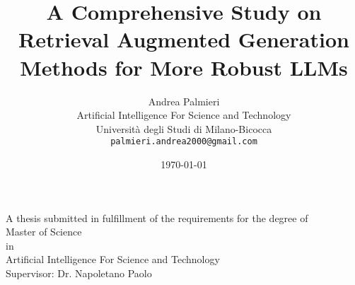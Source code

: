 \documentclass[12pt, a4paper]{report} %
\title{A Comprehensive Study on Retrieval Augmented Generation Methods for More Robust LLMs}
\author{Andrea Palmieri \\
        Artificial Intelligence For Science and Technology \\
        Università degli Studi di Milano-Bicocca \\
        \texttt{palmieri.andrea2000@gmail.com}}
\date{\today} %
\begin{document}
\begin{titlepage}
    \centering
    \vspace*{1cm} %
    {\Huge\bfseries \thetitle \par} %
    \vspace{1.5cm}
    {\Large \theauthor \par} %
    \vspace{2cm}
    A thesis submitted in fulfillment of the requirements for the degree of \\
    \vspace{0.5cm}
    {\Large Master of Science} \\
    in \\
    {\Large Artificial Intelligence For Science and Technology} \\
    \vspace{2cm}
    {\large Supervisor: Dr. Napoletano Paolo} \\ %
    \vfill %
    {\large \thedate \par} %
\end{titlepage}

\maketitle %
\end{document}
